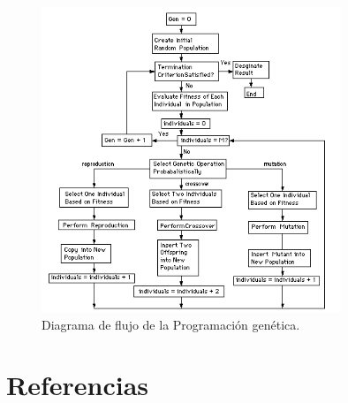 \documentclass[12pt]{article} \usepackage[utf8x]{inputenc}
\begin{document}
\begin{figure}[H]
  \centering
  \includegraphics[width=0.8\textwidth]{FlowchartGP.PNG}
  \caption{Diagrama de flujo de la Programación genética.}
  \label{fig:dfd:1}
\end{figure}


\section{Referencias}
\end{document}
